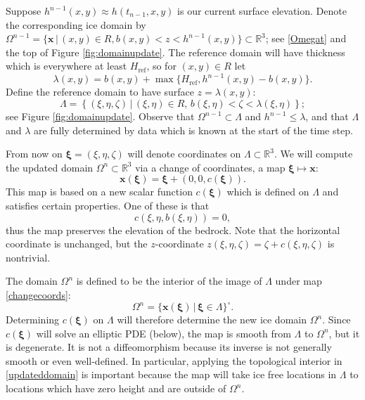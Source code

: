 \documentclass[letterpaper,final,12pt,reqno]{amsart}
\newcommand{\RR}{\mathbb{R}}
\newcommand{\bx}{\mathbf{x}}
\newcommand{\bxi}{\bm{\xi}}
\newcommand{\Href}{H_{\text{ref}}}
\begin{document}
Suppose $h^{n-1}(x,y) \approx h(t_{n-1},x,y)$ is our current surface elevation.  Denote the corresponding ice domain by $\Omega^{n-1}=\{\bx\,\big|\,(x,y)\in R, b(x,y)<z<h^{n-1}(x,y)\} \subset \RR^3$; see \eqref{Omegat} and the top of Figure \ref{fig:domainupdate}.  The reference domain will have thickness which is everywhere at least $\Href$, so for $(x,y) \in R$ let
\begin{equation}
\lambda(x,y) = b(x,y) + \max\{\Href,h^{n-1}(x,y)-b(x,y)\}. \label{definelambda}
\end{equation}
Define the reference domain to have surface $z=\lambda(x,y)$:
\begin{equation}
\Lambda = \left\{(\xi,\eta,\zeta)\,\big|\,(\xi,\eta)\in R, \, b(\xi,\eta) < \zeta < \lambda(\xi,\eta)\right\};  \label{Lambda}
\end{equation}
see Figure \ref{fig:domainupdate}.  Observe that $\Omega^{n-1} \subset \Lambda$ and $h^{n-1} \le \lambda$, and that $\Lambda$ and $\lambda$ are fully determined by data which is known at the start of the time step.

From now on $\bxi=(\xi,\eta,\zeta)$ will denote coordinates on $\Lambda \subset \RR^3$.  We will compute the updated domain $\Omega^n \subset \RR^3$ via a change of coordinates, a map $\bxi \mapsto \bx$:
\begin{equation}
\bx(\bxi) = \bxi + (0,0,c(\bxi)). \label{changecoords}
\end{equation}
This map is based on a new scalar function $c(\bxi)$ which is defined on $\Lambda$ and satisfies certain properties.  One of these is that
\begin{equation}
c(\xi,\eta,b(\xi,\eta))=0, \label{mapbasetobase}
\end{equation}
thus the map preserves the elevation of the bedrock.  Note that the horizontal coordinate is unchanged, but the $z$-coordinate $z(\xi,\eta,\zeta)=\zeta+c(\xi,\eta,\zeta)$ is nontrivial.

The domain $\Omega^n$ is defined to be the interior of the image of $\Lambda$ under map \eqref{changecoords}:
\begin{equation}
\Omega^n = \{\bx(\bxi) \,\big|\, \bxi \in \Lambda\}^\circ. \label{updateddomain}
\end{equation}
Determining $c(\bxi)$ on $\Lambda$ will therefore determine the new ice domain $\Omega^n$.  Since $c(\bxi)$ will solve an elliptic PDE (below), the map is smooth from $\Lambda$ to $\Omega^n$, but it is degenerate.  It is not a diffeomorphism because its inverse is not generally smooth or even well-defined.  In particular, applying the topological interior in \eqref{updateddomain} is important because the map will take ice free locations in $\Lambda$ to locations which have zero height and are outside of $\Omega^n$.
\end{document}
